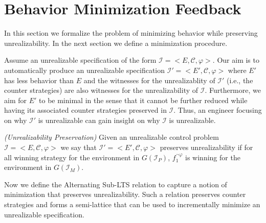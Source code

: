 \section{Behavior Minimization Feedback}\label{sec:problemStatement}

In this section we formalize the problem of minimizing behavior while preserving unrealizability. In the next section we define a minimization procedure.

Assume an unrealizable specification of the form $\mathcal{I} = <E, \mathcal{C}, \varphi>$. Our aim is to automatically produce an unrealizable specification $\mathcal{I'} = <E', \mathcal{C}, \varphi>$ where $E'$ has less behavior than $E$ and the witnesses for the unrealizablity of $\mathcal{I'}$ (i.e., the counter strategies) are also witnesses for the unrealizability of $\mathcal{I}$.  Furthermore, we aim for $E'$ to be minimal in the sense that it cannot be further reduced while having its associated counter strategies preserved in  $\mathcal{I}$.
Thus, an engineer focusing on why  $\mathcal{I'}$ is unrealizable can gain insight on why $\mathcal{I}$ is unrealizable. 


\begin{definition}\label{}\emph{(Unrealizability Preservation)}
Given an unrealizable control problem $\mathcal{I} = <E, \mathcal{C}, \varphi>$ we say
that $\mathcal{I'} = <E', \mathcal{C}, \varphi>$ preserves unrealizability
 if for all  winning strategy \counterS for
the environment in $G(\mathcal{I}_P)$, $f_1^{\neg \varphi}$ is winning for the environment in
$G(\mathcal{I}_M)$.
\end{definition}


Now we define the Alternating Sub-LTS relation to capture a notion of minimization that preserves unrealizability. Such a relation preserves counter strategies and forms a semi-lattice that can be used to incrementally minimize an unrealizable specification. 

%

